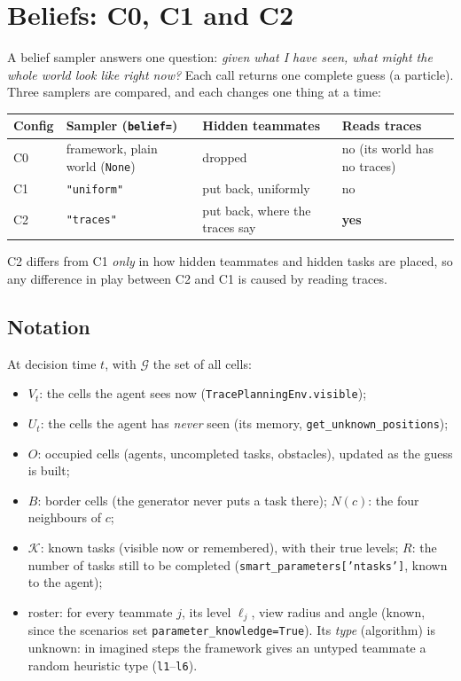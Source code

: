 \documentclass[11pt,a4paper]{article}
\newcommand{\code}[1]{\texttt{#1}}
\theoremstyle{remark}
\begin{document}
\section{Beliefs: C0, C1 and C2}
\label{sec:beliefs}

A belief sampler answers one question: \emph{given what I have seen, what might the whole world look like right now?}
Each call returns one complete guess (a particle). Three samplers are compared, and each changes one thing at a time:
\begin{center}
\begin{tabular}{lp{4.2cm}p{3.6cm}p{3.6cm}}
\toprule
Config & Sampler (\code{belief=}) & Hidden teammates & Reads traces \\
\midrule
C0 & framework, plain world (\code{None}) & dropped & no (its world has no traces) \\
C1 & \code{"uniform"} & put back, uniformly & no \\
C2 & \code{"traces"} & put back, where the traces say & \textbf{yes} \\
\bottomrule
\end{tabular}
\end{center}
C2 differs from C1 \emph{only} in how hidden teammates and hidden tasks are placed, so any difference in play between C2
and C1 is caused by reading traces.

\subsection{Notation}

At decision time $t$, with $\mathcal G$ the set of all cells:
\begin{itemize}[nosep]
  \item $V_t$: the cells the agent sees now (\code{TracePlanningEnv.visible});
  \item $U_t$: the cells the agent has \emph{never} seen (its memory, \code{get\_unknown\_positions});
  \item $O$: occupied cells (agents, uncompleted tasks, obstacles), updated as the guess is built;
  \item $B$: border cells (the generator never puts a task there); $N(c)$: the four neighbours of $c$;
  \item $\mathcal K$: known tasks (visible now or remembered), with their true levels; $R$: the number of tasks still
        to be completed (\code{smart\_parameters['ntasks']}, known to the agent);
  \item roster: for every teammate $j$, its level $\ell_j$, view radius and angle (known, since the scenarios set
        \code{parameter\_\allowbreak knowledge=True}).
        Its \emph{type} (algorithm) is unknown: in imagined steps the framework gives an untyped teammate a random
        heuristic type (\code{l1}--\code{l6}).
\end{itemize}
\end{document}
